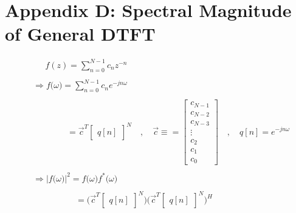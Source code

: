 \documentclass{article}
\begin{document}
\newpage
\section*{Appendix D: Spectral Magnitude of General DTFT}

\begin{align*}
    &\quad \ \ f(z) = \sum_{n = 0}^{N - 1}c_{n}z^{-n} \\ \\
    &\Rightarrow f\big(\omega\big) = \sum_{n = 0}^{N - 1}c_{n}e^{-jn\omega} \\ \\
    &\quad \quad \quad \quad = \vec{c}^{T}\begin{bmatrix} q[n] \end{bmatrix}^{N} \quad, \quad \vec{c} \equiv = \begin{bmatrix}
                                                                                                                    c_{N - 1} \\
                                                                                                                    c_{N - 2} \\
                                                                                                                    c_{N - 3} \\
                                                                                                                       \vdots \\
                                                                                                                    c_{    2} \\
                                                                                                                    c_{    1} \\
                                                                                                                    c_{    0}
                                                                                                                 \end{bmatrix} \quad, \quad q[n] = e^{-jn\omega} \\ \\
    &\Rightarrow \Big|f\big(\omega\big)\Big|^{2} = f\big(\omega\big)f^{*}\big(\omega\big) \\ \\
    &\quad \quad \quad \quad \quad = \bigg(\vec{c}^{T}\begin{bmatrix} q[n] \end{bmatrix}^{N}\bigg)\bigg(\vec{c}^{T}\begin{bmatrix} q[n] \end{bmatrix}^{N}\bigg)^{H} \\ \\

\end{align*}
\end{document}
